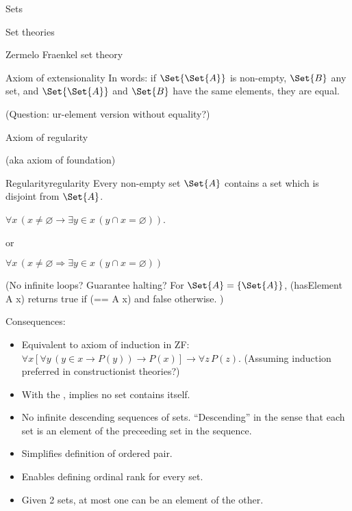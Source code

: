 \begin{plSection}{Sets}
\begin{plSection}{Set theories}
\begin{plSection}{Zermelo Fraenkel set theory}
\begin{plSection}{Axiom of extensionality}
In words: 
if $\Set{\Set{A}}$ is non-empty, $\Set{B}$ any set, 
and $\Set{\Set{A}}$ and $\Set{B}$ have the same
elements, they are equal.

(Question: ur-element version without equality?)

\end{plSection}%
\begin{plSection}{Axiom of regularity}

(aka axiom of foundation)~\cite{wiki:AxiomOfRegularity}

\begin{plAxiom}{Regularity}{regularity}
Every non-empty set $\Set{A}$ contains a set 
which is disjoint from $\Set{A}$.

$\forall x\,(x \neq \varnothing
\rightarrow 
\exists y\in x\,(y\cap x=\varnothing ))$.
 
or
 
$\forall x\,(x\neq \varnothing \Rightarrow 
 \exists y\in x\,(y\cap x=\varnothing ))$
 \end{plAxiom}
 
(No infinite loops? Guarantee halting? 
For $\Set{A} = \{\Set{A}\}$,
\textsf{(hasElement A x)} 
returns \textsf{true} if \textsf{(== A x)}
and \textsf{false} otherwise. )

Consequences:
\begin{itemize}
\item 
Equivalent to axiom of induction\cite{wiki:EpsilonInduction} 
in \textsf{ZF}:
$\forall x
[\forall y\,(y\in x\rightarrow P(y))\rightarrow P(x)]
\rightarrow \forall z\,P(z)$.
(Assuming induction preferred in constructionist theories?)

\item With the , 
implies no set contains itself.

\item No infinite descending sequences of sets.
``Descending'' in the sense that each set is an element of the
preceeding set in the sequence.

\item Simplifies definition of ordered pair.

\item Enables defining ordinal rank for every set.

\item Given 2 sets, at most one can be an element of the other.
\end{itemize}


\end{plSection}
\end{plSection}
\end{plSection}
\end{plSection}
